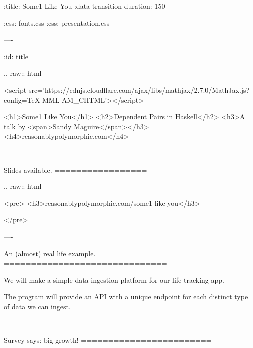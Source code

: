 :title: Some1 Like You
:data-transition-duration: 150

:css: fonts.css
:css: presentation.css


\newenvironment{table}{.. raw:: html

  <table>}{
  </table>
}

\newenvironment{hs}{.. code:: haskell
}{}
\newenvironment{raw}{.. raw:: html

  <pre>}{
  </pre>
}
\newenvironment{error}{.. raw:: html

  <pre class="error">}{    </pre>
}
\newenvironment{custom}{.. raw:: html

  <pre class="highlight code haskell">}{
  </pre>
}
\newcommand{\$}{\begin{verbatim}$\end{verbatim}}
\newcommand{\todo}[2]{#2}
\newcommand{\note}[1]{<span class="new">#1</span>}
\newcommand{\wat}[1]{<span class="wat">#1</span>}
\newcommand{\type}[1]{<span class="type">#1</span>}
\newcommand{\kind}[1]{<span class="kind">#1</span>}
\newcommand{\syn}[2]{<span class="#1">#2</span>}
\newcommand{\pragma}[1]{\{-# LANGUAGE #1 #-\}}
\newcommand{\pragmasyn}[1]{\syn{cm}{\{-# LANGUAGE #1 #-\}}}
\newcommand{\b}[1]{<pre class="highlight haskell code">#1</pre>}

----

:id: title

.. raw:: html

  <script src='https://cdnjs.cloudflare.com/ajax/libs/mathjax/2.7.0/MathJax.js?config=TeX-MML-AM_CHTML'></script>

  <h1>Some1 Like You</h1>
  <h2>Dependent Pairs in Haskell</h2>
  <h3>A talk by <span>Sandy Maguire</span></h3>
  <h4>reasonablypolymorphic.com</h4>

----

Slides available.
=================

\begin{raw}
  <h3>reasonablypolymorphic.com/some1-like-you</h3>
\end{raw}


----

An (almost) real life example.
==============================

We will make a simple data-ingestion platform for our life-tracking app.

The program will provide an API with a unique endpoint for each distinct type of data we can ingest.

----

Survey says: big growth!
========================

